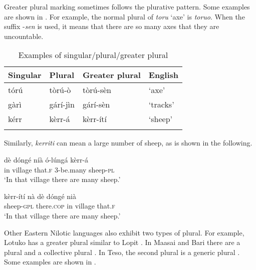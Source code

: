 \documentclass[output=paper]{langsci/langscibook}
\begin{document}
Greater plural marking sometimes follows the plurative pattern. Some examples are shown in . For example, the normal plural of \textit{toru} ‘axe’ is \textit{toruo}. When the suffix -\textit{sen }is used, it means that there are so many axes that they are uncountable.

\begin{table}
\begin{tabularx}{\textwidth}{XXXX}
\lsptoprule

 {Singular} & {Plural} & {Greater plural} & {English}\\ \midrule
 tórú &  tòrú-ò &  tòrú-sèn &  ‘axe’\\
 gàrì &  gárí-jìn &  gárí-sèn &  ‘tracks’\\
 kérr &  kèrr-á &  kèrr-ítí &  ‘sheep’\\
\lspbottomrule
\end{tabularx}
\caption{Examples of singular/plural/greater plural}
\label{tab:moodie:17}
\end{table}

Similarly, \textit{kerriti} can mean a large number of sheep, as is shown in the following.

\ea\label{ex:moodie:6}
\gll dè dóngé níà ó-lúngá kèrr-á \\
in village that.\textsc{f} 3-be.many sheep-\textsc{pl} \\
\glt ‘In that village there are many sheep.’
\z

\ea\label{ex:moodie:7}
\gll kèrr-ítí nà dè dóngé nià\\
sheep-\textsc{gpl} there.\textsc{cop} in village that.\textsc{f} \\
\glt ‘In that village there are many sheep.’
\z

Other Eastern Nilotic languages also exhibit two types of plural. For example, Lotuko has a greater plural similar to Lopit \citep[57]{Muratori1938}. In Maasai and Bari there are a plural and a collective plural \citep[242]{Dimmendaal2000}. In Teso, the second plural is a generic plural \citep[4]{HildersLawrance1957}. Some examples are shown in . 
\end{document}
